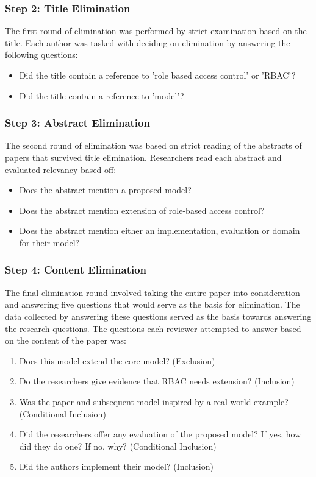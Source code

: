 \subsubsection{Step 2: Title Elimination}

The first round of elimination was performed by strict examination based on the title.  Each author was tasked with deciding on elimination by answering the following questions:

\begin{itemize}
\setlength{\itemsep}{0.25pt}
\item Did the title contain a reference to 'role based access control' or 'RBAC'? 
\item Did the title contain a reference to 'model'?
\end{itemize}

\subsubsection{Step 3: Abstract Elimination}

The second round of elimination was based on strict reading of the abstracts of papers that survived title elimination.  Researchers read each abstract and evaluated relevancy based off:

\begin{itemize}
\setlength{\itemsep}{0.25pt}
\item Does the abstract mention a proposed model?
\item Does the abstract mention extension of role-based access control?
\item Does the abstract mention either an implementation, evaluation or domain for their model?
\end{itemize}

\subsubsection{Step 4: Content Elimination}

The final elimination round involved taking the entire paper into consideration and answering five questions that would serve as the basis for elimination.  The data collected by answering these questions served as the basis towards answering the research questions.  The questions each reviewer attempted to answer based on the content of the paper was:

\begin{enumerate}
\setlength{\itemsep}{0.25pt}
\item Does this model extend the core model? (Exclusion)
\item Do the researchers give evidence that RBAC needs extension? (Inclusion)
\item Was the paper and subsequent model inspired by a real world example?  (Conditional Inclusion)
\item Did the researchers offer any evaluation of the proposed model? If yes, how did they do one? If no, why? (Conditional Inclusion)
\item Did the authors implement their model? (Inclusion)
\end{enumerate}

